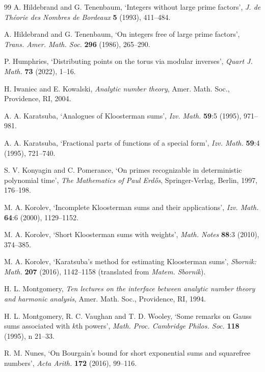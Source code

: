 \documentclass[12pt]{amsart}
\numberwithin{equation}{section}
\numberwithin{theorem}{section}
\numberwithin{table}{section}
\numberwithin{figure}{section}
\begin{document}
\begin{thebibliography}{99}
 A. Hildebrand and G. Tenenbaum, `Integers without large prime factors',
 {\it J. de Th{\'e}orie des Nombres de Bordeaux\/} {\bf 5} (1993), 411--484.

 A. Hildebrand and G. Tenenbaum, 
`On integers free of large prime factors', {\it Trans. Amer. Math. Soc.\/} 
{\bf 296} (1986), 265--290.


  P. Humphries,  
`Distributing points on the torus via modular inverses',  
  {\it Quart J. Math.\/} {\bf  73} (2022), 1--16. 


  H.  Iwaniec and E.  Kowalski,
{\it Analytic number theory\/}, Amer. Math.  Soc.,
Providence, RI, 2004.


 A. A. Karatsuba, `Analogues of Kloosterman sums',  {\it Izv. Math.} {\bf 59}:5 (1995), 971--981.

 A. A. Karatsuba, `Fractional parts of functions of a special form',  {\it Izv. Math.\/} {\bf 59}:4 (1995), 721--740.


 S. V. Konyagin and C. Pomerance,
`On primes recognizable in deterministic polynomial time',
{\it The Mathematics of Paul Erd\H os\/}, Springer-Verlag,
Berlin, 1997,  176--198.

 M. A. Korolev, `Incomplete Kloosterman sums and their applications',  {\it Izv. Math.\/} {\bf 64}:6 (2000), 1129--1152.




 M. A. Korolev, `Short Kloosterman sums with weights',  {\it Math. Notes\/} {\bf 88}:3 (2010), 374--385.



 M. A. Korolev, `Karatsuba's method for estimating Kloosterman sums',  
{\it Sbornik: Math.\/}  {\bf 207} (2016), 1142--1158
(translated from {\it Matem. Sbornik\/}). 



 H. L. Montgomery, {\it Ten lectures on the interface
between analytic number theory and harmonic analysis\/},  Amer.
Math. Soc.,  Providence, RI, 1994.

 H. L. Montgomery, R. C. Vaughan and T. D. Wooley, `Some remarks on
Gauss sums associated with $k$th powers', {\it Math. Proc.
Cambridge Philos. Soc.\/} {\bf 118} (1995), n 21--33.

  R. M. Nunes, 
`On Bourgain's bound for short exponential sums and squarefree numbers',
{\it Acta Arith.\/} {\bf 172} (2016),  99--116. 


\end{thebibliography}
\end{document}
